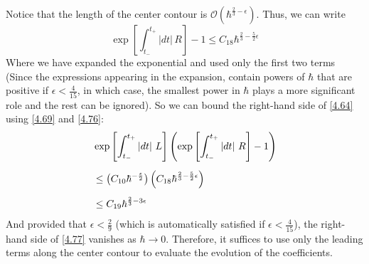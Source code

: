 \documentclass[12pt,a4paper]{article}
\begin{document}
	Notice that the length of the center contour is $\mathcal{O}(\hbar^{\frac{2}{3} - \epsilon})$. Thus, we can write
	\begin{equation}
		\exp\left[ \int_{t_{-}}^{t_{+}} \left| dt \right|\, R \right] - 1 \leq  C_{18} \hbar^{\frac{2}{3} - \frac{5}{2} \epsilon} \label{4.76}
	\end{equation}
	Where we have expanded the exponential and used only the first two terms (Since the expressions appearing in the expansion, contain powers of $\hbar$ that are positive if $\boxed{\epsilon < \frac{4}{15}}$, in which case, the smallest power in $\hbar$ plays a more significant role and the rest can be ignored). So we can bound the right-hand side of \eqref{4.64} using \eqref{4.69} and \eqref{4.76}:
	\begin{align}
		&\exp\left[ \int_{t_{-}}^{t_{+}} \left| dt \right|\, L \right] \left( \exp\left[ \int_{t_{-}}^{t_{+}} \left| dt \right|\, R \right] - 1 \right) \notag \\[5pt]
		&\leq \left( C_{10} \hbar^{-\frac{\epsilon}{2}} \right) \left( C_{18} \hbar^{\frac{2}{3} - \frac{5}{2} \epsilon} \right) \notag \\[5pt]
		&\leq C_{19} \hbar^{\frac{2}{3} - 3\epsilon} \label{4.77}
	\end{align}
	And provided that $\epsilon < \frac{2}{9}$ (which is automatically satisfied if $\epsilon < \frac{4}{15}$), the right-hand side of \eqref{4.77} vanishes as $\hbar \rightarrow 0$. Therefore, it suffices to use only the leading terms along the center contour to evaluate the evolution of the coefficients.
	
\end{document}
